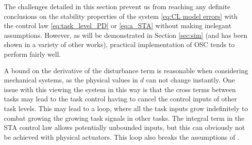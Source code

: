 \documentclass[../main.tex]{subfiles}
\begin{document}

The challenges detailed in this section prevent us from reaching any definite conclusions on the stability properties of the system \eqref{eq:CL model errors} with the control law \eqref{eq:task_level_PD} or \eqref{eq:a_STA} without making inelegant assumptions. However, as will be demonstrated in Section \ref{sec:sim} (and has been shown in a variety of other works), practical implementation of OSC tends to perform fairly well.

\iffalse
A bound on the derivative of the disturbance term is reasonable when considering mechanical systems, as the physical values in $d$ can not change instantly. One issue with this viewing the system in this way is that the cross terms between tasks may lead to the task control having to cancel the control inputs of other task levels. This may lead to a loop, where all the task inputs grow indefinitely to combat growing the growing task signals in other tasks. The integral term in the STA control law allows potentially unbounded inputs, but this can obviously not be achieved with physical actuators. This loop also breaks the assumptions of \cite{Castillo2018}.
\end{document}
